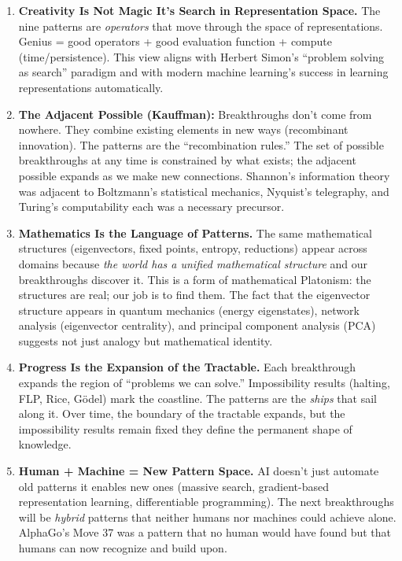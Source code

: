 \begin{enumerate}
\item \textbf{Creativity Is Not Magic It's Search in Representation Space.} The nine patterns are \emph{operators} that move through the space of representations. Genius = good operators + good evaluation function + compute (time/persistence). This view aligns with Herbert Simon's ``problem solving as search'' paradigm and with modern machine learning's success in learning representations automatically.

\item \textbf{The Adjacent Possible (Kauffman):} Breakthroughs don't come from nowhere. They combine existing elements in new ways (recombinant innovation). The patterns are the ``recombination rules.'' The set of possible breakthroughs at any time is constrained by what exists; the adjacent possible expands as we make new connections. Shannon's information theory was adjacent to Boltzmann's statistical mechanics, Nyquist's telegraphy, and Turing's computability each was a necessary precursor.

\item \textbf{Mathematics Is the Language of Patterns.} The same mathematical structures (eigenvectors, fixed points, entropy, reductions) appear across domains because \emph{the world has a unified mathematical structure} and our breakthroughs discover it. This is a form of mathematical Platonism: the structures are real; our job is to find them. The fact that the eigenvector structure appears in quantum mechanics (energy eigenstates), network analysis (eigenvector centrality), and principal component analysis (PCA) suggests not just analogy but mathematical identity.

\item \textbf{Progress Is the Expansion of the Tractable.} Each breakthrough expands the region of ``problems we can solve.'' Impossibility results (halting, FLP, Rice, G\"odel) mark the coastline. The patterns are the \emph{ships} that sail along it. Over time, the boundary of the tractable expands, but the impossibility results remain fixed they define the permanent shape of knowledge.

\item \textbf{Human + Machine = New Pattern Space.} AI doesn't just automate old patterns it enables new ones (massive search, gradient-based representation learning, differentiable programming). The next breakthroughs will be \emph{hybrid} patterns that neither humans nor machines could achieve alone. AlphaGo's Move 37 was a pattern that no human would have found but that humans can now recognize and build upon.


\end{enumerate}
